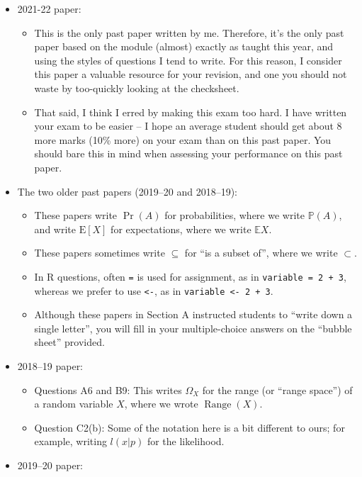 \documentclass[
  letterpaper,
]{report}
\providecommand{\tightlist}{%
  \setlength{\itemsep}{0pt}\setlength{\parskip}{0pt}}\usepackage{longtable,booktabs,array}
\theoremstyle{definition}
\theoremstyle{definition}
\theoremstyle{remark}
\begin{document}
\begin{itemize}
\tightlist
\item
  2021-22 paper:

  \begin{itemize}
  \tightlist
  \item
    This is the only past paper written by me. Therefore, it's the only
    past paper based on the module (almost) exactly as taught this year,
    and using the styles of questions I tend to write. For this reason,
    I consider this paper a valuable resource for your revision, and one
    you should not waste by too-quickly looking at the checksheet.
  \item
    That said, I think I erred by making this exam too hard. I have
    written your exam to be easier -- I hope an average student should
    get about 8 more marks (10\% more) on your exam than on this past
    paper. You should bare this in mind when assessing your performance
    on this past paper.
  \end{itemize}
\item
  The two older past papers (2019--20 and 2018--19):

  \begin{itemize}
  \tightlist
  \item
    These papers write \(\Pr(A)\) for probabilities, where we write
    \(\mathbb P(A)\), and write \(\mathrm{E}[X]\) for expectations,
    where we write \(\mathbb EX\).
  \item
    These papers sometimes write \(\subseteq\) for ``is a subset of'',
    where we write \(\subset\).
  \item
    In R questions, often \texttt{=} is used for assignment, as in
    \texttt{variable\ =\ 2\ +\ 3}, whereas we prefer to use
    \texttt{\textless{}-}, as in
    \texttt{variable\ \textless{}-\ 2\ +\ 3}.
  \item
    Although these papers in Section A instructed students to ``write
    down a single letter'', you will fill in your multiple-choice
    answers on the ``bubble sheet'' provided.
  \end{itemize}
\item
  2018--19 paper:

  \begin{itemize}
  \tightlist
  \item
    Questions A6 and B9: This writes \(\Omega_X\) for the range (or
    ``range space'') of a random variable \(X\), where we wrote
    \(\operatorname{Range}(X)\).
  \item
    Question C2(b): Some of the notation here is a bit different to
    ours; for example, writing \(l(x|p)\) for the likelihood.
  \end{itemize}
\item
  2019--20 paper:


\end{itemize}
\end{document}
